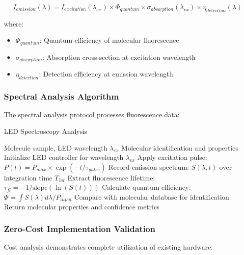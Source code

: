 \begin{equation}
I_{emission}(\lambda) = I_{excitation}(\lambda_{ex}) \times \Phi_{quantum} \times \sigma_{absorption}(\lambda_{ex}) \times \eta_{detection}(\lambda)
\end{equation}

where:
\begin{itemize}
\item $\Phi_{quantum}$: Quantum efficiency of molecular fluorescence
\item $\sigma_{absorption}$: Absorption cross-section at excitation wavelength
\item $\eta_{detection}$: Detection efficiency at emission wavelength
\end{itemize}

\subsubsection{Spectral Analysis Algorithm}

The spectral analysis protocol processes fluorescence data:

\begin{algorithm}[H]
\caption{LED Spectroscopy Analysis}
\begin{algorithmic}[1]
\REQUIRE Molecule sample, LED wavelength $\lambda_{ex}$
\ENSURE Molecular identification and properties
\STATE Initialize LED controller for wavelength $\lambda_{ex}$
\STATE Apply excitation pulse: $P(t) = P_{max} \times \exp(-t/\tau_{pulse})$
\STATE Record emission spectrum: $S(\lambda, t)$ over integration time $T_{int}$
\STATE Extract fluorescence lifetime: $\tau_{fl} = -1/\text{slope}(\ln(S(t)))$
\STATE Calculate quantum efficiency: $\Phi = \int S(\lambda) d\lambda / P_{input}$
\STATE Compare with molecular database for identification
\STATE Return molecular properties and confidence metrics
\end{algorithmic}
\end{algorithm}

\subsubsection{Zero-Cost Implementation Validation}

Cost analysis demonstrates complete utilization of existing hardware:

